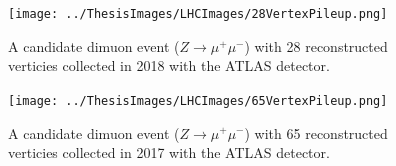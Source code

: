 \begin{figure}[h!]
	\centering
	\texttt{[image: ../ThesisImages/LHCImages/28VertexPileup.png]}
	\caption[A candidate dimuon event ($Z\rightarrow \mu^+ \mu^-$) with 28 reconstructed verticies collected in 2018 with the ATLAS detector.]{ A candidate dimuon event ($Z\rightarrow \mu^+ \mu^-$) with 28 reconstructed verticies collected in 2018 with the ATLAS detector.\cite{ATLASLumi}
	}
	\label{fig:HighPileup}
\end{figure}

\begin{figure}[h!]
	\centering
	\texttt{[image: ../ThesisImages/LHCImages/65VertexPileup.png]}
	\caption[A candidate dimuon event ($Z\rightarrow \mu^+ \mu^-$) with 65 reconstructed verticies collected in 2017 with the ATLAS detector.]{ A candidate dimuon event ($Z\rightarrow \mu^+ \mu^-$) with 65 reconstructed verticies collected in 2017 with the ATLAS detector.\cite{ATLASLumi}
	}
	\label{fig:HighPileup2}
\end{figure}

